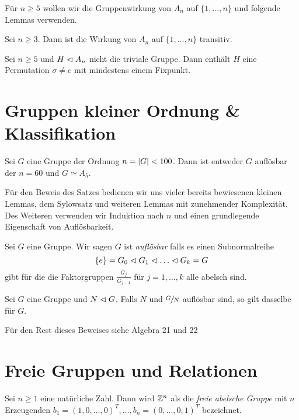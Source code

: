 Für $n \geq 5$ wollen wir die Gruppenwirkung von $A_{n}$ auf $\{1,\ldots,n\}$ und folgende Lemmas verwenden.

\begin{lemma}
	Sei $n \geq 3$. Dann ist die Wirkung von $A_{n}$ auf $\{1,\ldots,n\} $ transitiv.
\end{lemma}


\begin{lemma}
	Sei $n \geq 5$ und $H \vartriangleleft A_{n}$ nicht die triviale Gruppe. Dann enthält $H$ eine Permutation $\sigma \neq e$ mit mindestens einem Fixpunkt.
\end{lemma}




\section{Gruppen kleiner Ordnung \& Klassifikation}

\begin{theorem}
	Sei $G$ eine Gruppe der Ordnung $n = \abs{G} < 100$. 
	Dann ist entweder $G$ auflösbar der $n = 60$ und $G \simeq A_5$.
\end{theorem}

Für den Beweis des Satzes bedienen wir uns vieler bereits bewiesenen kleinen Lemmas,
dem Sylowsatz und weiteren Lemmas mit zunehmender Komplexität.
Des Weiteren verwenden wir Induktion nach $n$ und einen grundlegende Eigenschaft von Auflösbarkeit.

\begin{definition}[Wiederholung]
	Sei $G$ eine Gruppe. Wir sagen $G$ ist \emph{auflösbar} falls es einen Subnormalreihe
	\[
	\{e\} = G_0 \vartriangleleft G_1 \vartriangleleft \ldots \vartriangleleft G_{k} = G
	\]
	gibt für die die Faktorgruppen $\frac{G_{j}}{G_{j-1}}$ für $j = 1,\ldots,k$ alle abelsch sind.
\end{definition}

\begin{proposition}
	Sei $G$ eine Gruppe und $N \vartriangleleft G$. Falls $N$ und $\sfrac{G}{N}$ auflösbar sind, so gilt dasselbe für $G$.
\end{proposition}


Für den Rest dieses Beweises siehe Algebra 21 und 22

\section{Freie Gruppen und Relationen}
\begin{definition}
	Sei $n \geq 1$ eine natürliche Zahl. Dann wird $\mathbb{Z}^{n}$ als die \emph{freie abelsche Gruppe} mit $n$ Erzeugenden  
	$b_1 = (1,0,\ldots,0)^{T}, \ldots , b_{n} = (0,\ldots,0,1)^{T}$ bezeichnet.
\end{definition}

